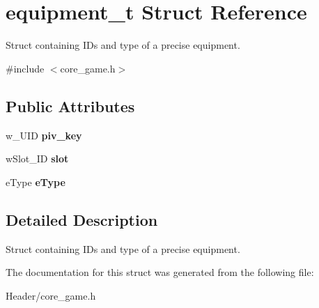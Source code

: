 \hypertarget{structequipment__t}{}\section{equipment\+\_\+t Struct Reference}
\label{structequipment__t}


Struct containing I\+Ds and type of a precise equipment.  




{\ttfamily \#include $<$core\+\_\+game.\+h$>$}

\subsection*{Public Attributes}
\begin{DoxyCompactItemize}
\item 
\mbox{\label{structequipment__t_aaa23b11feee19b32974cced75893f8e7}} 
w\+\_\+\+U\+ID {\bfseries piv\+\_\+key}
\item 
\mbox{\label{structequipment__t_a99b5fec195cdc6279ebab5002e629b4c}} 
w\+Slot\+\_\+\+ID {\bfseries slot}
\item 
\mbox{\label{structequipment__t_aa2f64548a417f35a95808d73f7db44de}} 
e\+Type {\bfseries e\+Type}
\end{DoxyCompactItemize}


\subsection{Detailed Description}
Struct containing I\+Ds and type of a precise equipment. 

The documentation for this struct was generated from the following file\+:\begin{DoxyCompactItemize}
\item 
Header/core\+\_\+game.\+h\end{DoxyCompactItemize}
